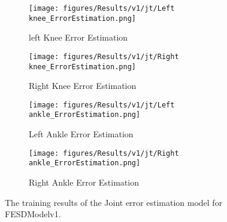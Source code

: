 \begin{figure}[!ht]
  \centering
  \begin{subfigure}[b]{0.47\linewidth}
      \centering
      \texttt{[image: figures/Results/v1/jt/Left knee\_ErrorEstimation.png]}
      \caption{left Knee Error Estimation}
      \label{fig:v1_lekn_jt_ee}
  \end{subfigure}
  \hfill
  \begin{subfigure}[b]{0.47\linewidth}
      \centering
      \texttt{[image: figures/Results/v1/jt/Right knee\_ErrorEstimation.png]}
      \caption{Right Knee Error Estimation}
      \label{fig:v1_rikn_jt_ee}
  \end{subfigure}
  \hfill
  \begin{subfigure}[b]{0.47\linewidth}
      \centering
      \texttt{[image: figures/Results/v1/jt/Left ankle\_ErrorEstimation.png]}
      \caption{Left Ankle Error Estimation}
      \label{fig:v1_lean_jt_ee}
  \end{subfigure}
  \hfill
  \begin{subfigure}[b]{0.47\linewidth}
      \centering
      \texttt{[image: figures/Results/v1/jt/Right ankle\_ErrorEstimation.png]}
      \caption{Right Ankle Error Estimation}
      \label{fig:v1_rian_jt_ee}
  \end{subfigure}
  \caption[Detailed Training results for FESDModelv2]{The training results of the Joint error estimation model for FESDModelv1.}
\end{figure}